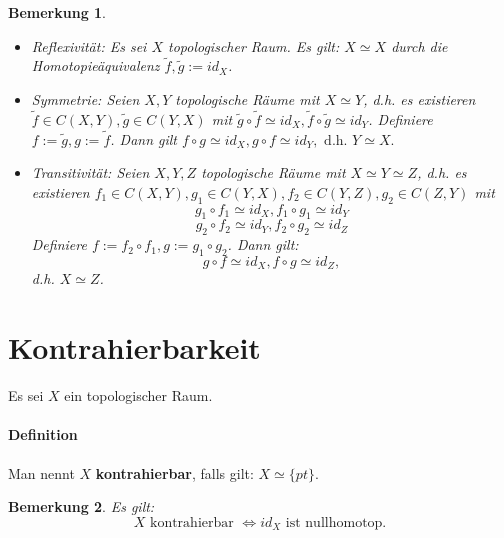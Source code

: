 \documentclass[a4paper,11pt,notitlepage]{report}
\newtheorem{remark}{Bemerkung}[chapter]
\begin{document}
\begin{remark}
	$ $
	\begin{itemize}
		\item Reflexivität: Es sei $X$ topologischer Raum.
			Es gilt: $X \simeq X$ durch die Homotopieäquivalenz $\tilde{f},\tilde{g} := id_X$.
		\item Symmetrie: Seien $X,Y$ topologische Räume mit $X \simeq Y$, d.h. es existieren $\tilde{f} \in C(X,Y), \tilde{g} \in C(Y,X)$ mit $\tilde{g} \circ \tilde{f} \simeq id_X, \tilde{f} \circ \tilde{g} \simeq id_Y$.
		Definiere $f:= \tilde{g}, g:= \tilde{f}$.
		Dann gilt $f \circ g \simeq id_X, g \circ f \simeq id_Y,\text{ d.h. }Y \simeq X.$
		
		\item Transitivität: Seien $X,Y,Z$ topologische Räume mit $X \simeq Y \simeq Z$, d.h. es existieren $f_1 \in C(X,Y), g_1 \in C(Y,X), f_2 \in C(Y,Z), g_2 \in C(Z,Y)$ mit
		$$g_1 \circ f_1 \simeq id_X, f_1 \circ g_1 \simeq id_Y$$
		$$g_2 \circ f_2 \simeq id_Y, f_2 \circ g_2 \simeq id_Z$$
		Definiere $f := f_2 \circ f_1, g:= g_1 \circ g_2$. Dann gilt:
		$$g \circ f \simeq id_X, f \circ g \simeq id_Z,$$
		d.h. $X \simeq Z$.
	\end{itemize}
\end{remark}

\section{Kontrahierbarkeit}
Es sei $X$ ein topologischer Raum.

\paragraph{Definition} Man nennt $X$ \textbf{kontrahierbar}, falls gilt: $X \simeq \{pt\}$.

\begin{remark}
	Es gilt:
	$$X \text{ kontrahierbar } \Leftrightarrow id_X \text{ ist nullhomotop.}$$
\end{remark}
\end{document}
